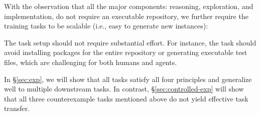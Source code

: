 With the observation that all the major components: reasoning, exploration, and implementation, do not require an executable repository, we further require the training tasks to be scalable (i.e., easy to generate new instances):

 The task setup should not require substantial effort. For instance, the task should avoid installing packages for the entire repository or generating executable test files, which are challenging for both humans and agents.

In \S\ref{sec:exp}, we will show that all \hybridmethodname tasks satisfy all four principles and generalize well to multiple downstream tasks.
In contrast, \S\ref{sec:controlled-exp} will show that all three counterexample tasks mentioned above do not yield effective task transfer.


\begin{table}[t]
\centering
{}
\caption{The average number of OpenHands tools called in each trajectory.}
\label{tab:openhands-tool-distribution}
\end{table}

\begin{table}[t]
\centering
{}
\caption{Performance of the student and teacher models on a subset of instances sampled from each training task.}
\label{tab:distillation-sanity-check}
\end{table}


